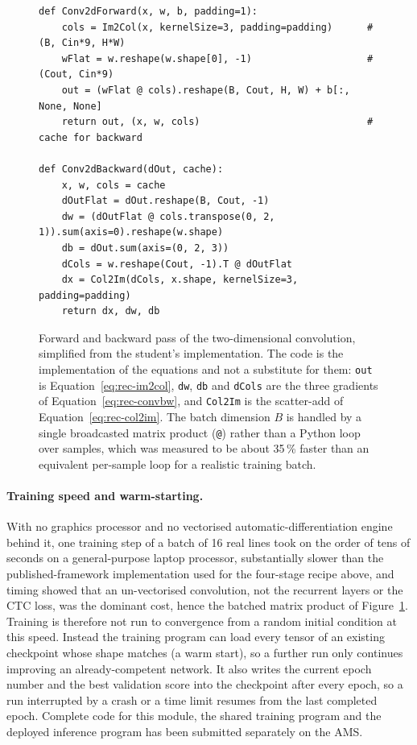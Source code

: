 \begin{figure}[h]
\centering
\fontsize{8.5}{10}\selectfont
\begin{verbatim}
def Conv2dForward(x, w, b, padding=1):
    cols = Im2Col(x, kernelSize=3, padding=padding)      # (B, Cin*9, H*W)
    wFlat = w.reshape(w.shape[0], -1)                    # (Cout, Cin*9)
    out = (wFlat @ cols).reshape(B, Cout, H, W) + b[:, None, None]
    return out, (x, w, cols)                             # cache for backward

def Conv2dBackward(dOut, cache):
    x, w, cols = cache
    dOutFlat = dOut.reshape(B, Cout, -1)
    dw = (dOutFlat @ cols.transpose(0, 2, 1)).sum(axis=0).reshape(w.shape)
    db = dOut.sum(axis=(0, 2, 3))
    dCols = w.reshape(Cout, -1).T @ dOutFlat
    dx = Col2Im(dCols, x.shape, kernelSize=3, padding=padding)
    return dx, dw, db
\end{verbatim}
\caption{Forward and backward pass of the two-dimensional convolution, simplified from the student's implementation. The code is the implementation of the equations and not a substitute for them: \texttt{out} is Equation~\ref{eq:rec-im2col}, \texttt{dw}, \texttt{db} and \texttt{dCols} are the three gradients of Equation~\ref{eq:rec-convbw}, and \texttt{Col2Im} is the scatter-add of Equation~\ref{eq:rec-col2im}. The batch dimension $B$ is handled by a single broadcasted matrix product (\texttt{@}) rather than a Python loop over samples, which was measured to be about 35\,\% faster than an equivalent per-sample loop for a realistic training batch.}
\label{fig:rec-conv2d}
\end{figure}

\paragraph{Training speed and warm-starting.}
With no graphics processor and no vectorised automatic-differentiation engine behind it, one training step of a batch of 16 real lines took on the order of tens of seconds on a general-purpose laptop processor, substantially slower than the published-framework implementation used for the four-stage recipe above, and timing showed that an un-vectorised convolution, not the recurrent layers or the CTC loss, was the dominant cost, hence the batched matrix product of Figure~\ref{fig:rec-conv2d}.
Training is therefore not run to convergence from a random initial condition at this speed.
Instead the training program can load every tensor of an existing checkpoint whose shape matches (a warm start), so a further run only continues improving an already-competent network.
It also writes the current epoch number and the best validation score into the checkpoint after every epoch, so a run interrupted by a crash or a time limit resumes from the last completed epoch.
Complete code for this module, the shared training program and the deployed inference program has been submitted separately on the AMS.

